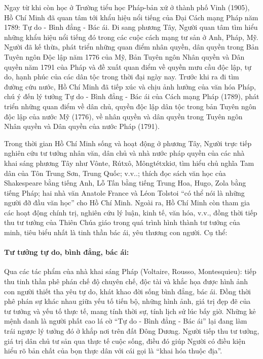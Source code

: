 Ngay từ khi còn học ở Trường tiểu học Pháp-bản xứ ở thành phố Vinh (1905), Hồ Chí Minh đã quan tâm tới khẩu hiệu nổi tiếng của Đại Cách mạng Pháp năm 1789: Tự do - Bình đẳng - Bác ái. Đi sang phương Tây, Người quan tâm tìm hiểu những khẩu hiệu nổi tiếng đó trong các cuộc cách mạng tư sản ở Anh, Pháp, Mỹ. Người đã kế thừa, phát triển những quan điểm nhân quyền, dân quyền trong Bản Tuyên ngôn Độc lập năm 1776 của Mỹ, Bản Tuyên ngôn Nhân quyền và Dân quyền năm 1791 của Pháp và đề xuất quan điểm về quyền mưu cầu độc lập, tự do, hạnh phúc của các dân tộc trong thời đại ngày nay. Trước khi ra đi tìm đường cứu nước, Hồ Chí Minh đã tiếp xúc và chịu ảnh hưởng của văn hóa Pháp, chú ý đến lý tưởng Tự do - Bình đẳng - Bác ái của Cách mạng Pháp (1789), phát triển những quan điểm về dân chủ, quyền độc lập dân tộc trong bản Tuyên ngôn độc lập của nước Mỹ (1776), về nhân quyền và dân quyền trong Tuyên ngôn Nhân quyền và Dân quyền của nước Pháp (1791).

Trong thời gian Hồ Chí Minh sống và hoạt động ở phương Tây, Người trực tiếp nghiên cứu tư tưởng nhân văn, dân chủ và nhà nước pháp quyền của các nhà khai sáng phương Tây như Vônte, Rútxô, Môngtétxkiơ, tìm hiểu chủ nghĩa Tam dân của Tôn Trung Sơn, Trung Quốc; v.v..; thích đọc sách văn học của Shakespeare bằng tiếng Anh, Lỗ Tấn bằng tiếng Trung Hoa, Hugo, Zola bằng tiếng Pháp; hai nhà văn Anatole France và Léon Tolstoi ``có thể nói là những người đỡ đầu văn học'' cho Hồ Chí Minh. Ngoài ra, Hồ Chí Minh còn tham gia các hoạt động chính trị, nghiên cứu lý luận, kinh tế, văn hóa, v.v., đồng thời tiếp thu tư tưởng của Thiên Chúa giáo trong quá trình hình thành tư tưởng của minh, tiêu biểu nhất là tinh thần bác ái, yêu thương con người. Cụ thể:

\paragraph{Tư tưởng tự do, bình đẳng, bác ái:}
Qua các tác phẩm của nhà khai sáng Pháp (Voltaire, Rousso, Montesquieu): tiếp thu tinh thần phê phán chế độ chuyên chế, độc tài và khắc họa được hình ảnh con người thiết tha yêu tự do, khát khao đời sống bình đẳng, bác ái. Đồng thời phê phán sự khác nhau giữa yếu tố tiến bộ, những hình ảnh, giá trị đẹp đẽ của tư tưởng và yếu tố thực tế, mang tính thời sự, tính lịch sử lúc bấy giờ. Những kẻ mệnh danh là người phất cao lá cờ ``Tự do - Bình đẳng - Bác ái'' lại đang làm trái ngược lý tưởng đó ở khắp nơi trên đất Đông Dương. Người tiếp thu tư tưởng, giá trị dân chủ tư sản qua thực tế cuộc sống, điều đó giúp Người có điều kiện hiểu rõ bản chất của bọn thực dân với cái gọi là ``khai hóa thuộc địa''.

